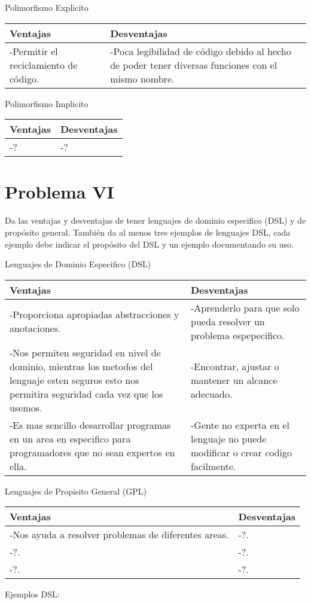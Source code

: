 \documentclass{article}
\begin{document}
\begin{center}
Polimorfismo Explicito
\end{center}
\begin{tabularx}{\textwidth}{X|X}
	  \textbf{Ventajas} & \textbf{Desventajas} \\
	\hline
	-Permitir el reciclamiento de código. & -Poca legibilidad de código debido al hecho de poder tener diversas funciones con el mismo nombre.
\end{tabularx}

\begin{center}
Polimorfismo Implicito
\end{center}
\begin{tabularx}{\textwidth}{X|X}
	  \textbf{Ventajas} & \textbf{Desventajas} \\
	\hline
	-? & -?
\end{tabularx}


\section*{Problema VI}
Da las ventajas y desventajas de tener lenguajes de dominio especifico (DSL)
y de propósito general. También da al menos tres ejemplos de lenguajes DSL,
cada ejemplo debe indicar el propósito del DSL y un ejemplo documentando su uso.
\\
\begin{center}
Lenguajes de Dominio Especifico (DSL)
\end{center}
\begin{tabularx}{\textwidth}{X|X}
	  \textbf{Ventajas} & \textbf{Desventajas} \\
	\hline
	-Proporciona apropiadas abstracciones y anotaciones. & -Aprenderlo para que solo pueda resolver un problema espepecifico.\\
	-Nos permiten seguridad en nivel de dominio, mientras los metodos del lenguaje esten seguros esto nos permitira seguridad cada vez que los usemos. & -Encontrar, ajustar o mantener un alcance adecuado.\\
	-Es mas sencillo desarrollar programas en un area en especifico para programadores que no sean expertos en ella. & -Gente no experta en el lenguaje no puede modificar o crear codigo facilmente.\\
\end{tabularx}

\begin{center}
Lenguajes de Propisito General (GPL)
\end{center}
\begin{tabularx}{\textwidth}{X|X}
	  \textbf{Ventajas} & \textbf{Desventajas} \\
	\hline
	-Nos ayuda a resolver problemas de diferentes areas. & -?.\\
	-?. & -?.\\
	-?. & -?.\\
\end{tabularx}
\begin{center}
Ejemplos DSL:
\end{center}
\end{document}
